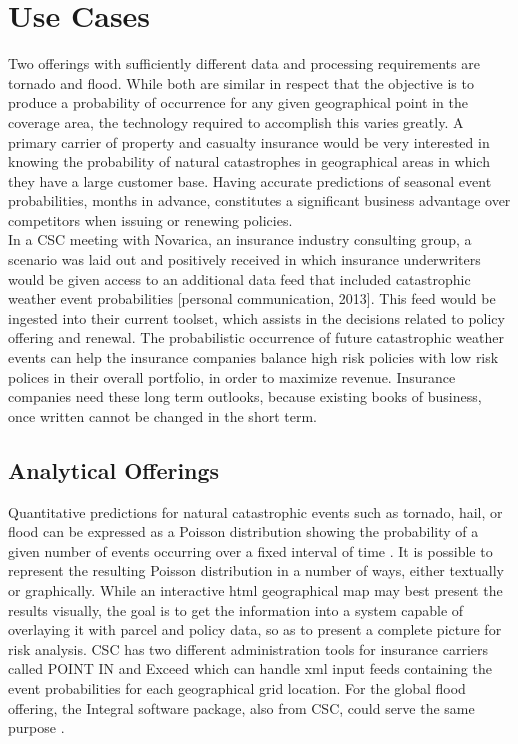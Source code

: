 \section{Use Cases}
Two offerings with sufficiently different data and processing requirements are tornado and flood. While both are similar in  respect that the objective is to produce a probability of occurrence for any given geographical point in the coverage area, the technology required to accomplish this varies greatly. A primary carrier of property and casualty insurance would be very interested in knowing the probability of natural catastrophes in geographical areas in which they have a large customer base. Having accurate predictions of seasonal event probabilities, months in advance, constitutes a significant business advantage over competitors when issuing or renewing policies.\\

In a \textsc{CSC} meeting with Novarica, an insurance industry consulting group, a scenario was laid out and positively received in which insurance underwriters would be given access to an additional data feed that included catastrophic weather event probabilities [personal communication, 2013]. This feed would be ingested into their current toolset, which assists in the decisions related to policy offering and renewal. The probabilistic occurrence of future catastrophic weather events can help the insurance companies balance high risk policies with low risk polices in their overall portfolio, in order to maximize revenue. Insurance companies need these long term outlooks, because existing books of business, once written cannot be changed in the short term.
\subsection{Analytical Offerings}
Quantitative predictions for natural catastrophic events such as tornado, hail, or flood can be expressed as a Poisson distribution showing the probability of a given number of events occurring over a fixed interval of time \cite{anderson}. It is possible to represent the resulting Poisson distribution in a number of ways, either textually or graphically. While an interactive \gls{html} geographical map may best present the results visually, the goal is to get the information into a system capable of overlaying it with parcel and policy data, so as to present a complete picture for risk analysis. \textsc{CSC} has two different administration tools for insurance carriers called POINT IN and Exceed which can handle \gls{xml} input feeds containing the event probabilities for each geographical grid location. For the global flood offering, the Integral software package, also from \textsc{CSC}, could serve the same purpose \cite{integral}. \\

